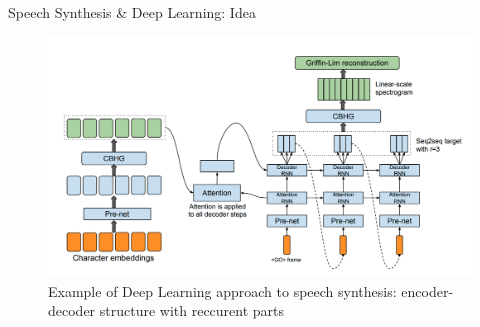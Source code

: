 \begin{frame}{Speech Synthesis \& Deep Learning: Idea}
	\begin{figure}
		\centering
		\includegraphics[width=0.99\linewidth]{figs/tts.png}
		\caption{Example of Deep Learning approach to speech synthesis: encoder-decoder structure with reccurent parts}
	\end{figure}
\end{frame}
